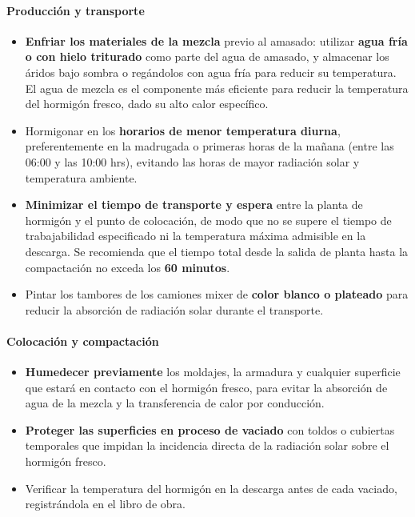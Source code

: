 \paragraph{Producción y transporte}
\begin{itemize}
    \item \textbf{Enfriar los materiales de la mezcla} previo al amasado: utilizar \textbf{agua fría o con hielo triturado} como parte del agua de amasado, y almacenar los áridos bajo sombra o regándolos con agua fría para reducir su temperatura. El agua de mezcla es el componente más eficiente para reducir la temperatura del hormigón fresco, dado su alto calor específico.
    \item Hormigonar en los \textbf{horarios de menor temperatura diurna}, preferentemente en la madrugada o primeras horas de la mañana (entre las 06:00 y las 10:00 hrs), evitando las horas de mayor radiación solar y temperatura ambiente.
    \item \textbf{Minimizar el tiempo de transporte y espera} entre la planta de hormigón y el punto de colocación, de modo que no se supere el tiempo de trabajabilidad especificado ni la temperatura máxima admisible en la descarga. Se recomienda que el tiempo total desde la salida de planta hasta la compactación no exceda los \textbf{60 minutos}.
    \item Pintar los tambores de los camiones mixer de \textbf{color blanco o plateado} para reducir la absorción de radiación solar durante el transporte.
\end{itemize}

\paragraph{Colocación y compactación}
\begin{itemize}
    \item \textbf{Humedecer previamente} los moldajes, la armadura y cualquier superficie que estará en contacto con el hormigón fresco, para evitar la absorción de agua de la mezcla y la transferencia de calor por conducción.
    \item \textbf{Proteger las superficies en proceso de vaciado} con toldos o cubiertas temporales que impidan la incidencia directa de la radiación solar sobre el hormigón fresco.
    \item Verificar la temperatura del hormigón en la descarga antes de cada vaciado, registrándola en el libro de obra.
\end{itemize}

